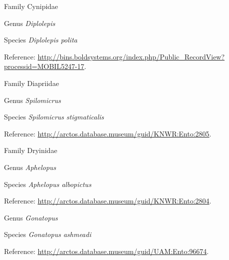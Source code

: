 \documentclass[9pt, article]{memoir}
\begin{document}
\begin{multicols}{2}
\vspace{6pt}\noindent\hspace{24pt}Family Cynipidae


\vspace{6pt}\noindent\hspace{30pt}Genus \textit{Diplolepis}


\vspace{6pt}\noindent\hspace{36pt}Species \textit{Diplolepis polita}


\vspace{6pt}Reference: 
\url{http://bins.boldsystems.org/index.php/Public_RecordView?processid=MOBIL5247-17}.

\vspace{6pt}\noindent\hspace{24pt}Family Diapriidae


\vspace{6pt}\noindent\hspace{30pt}Genus \textit{Spilomicrus}


\vspace{6pt}\noindent\hspace{36pt}Species \textit{Spilomicrus stigmaticalis}


\vspace{6pt}Reference: 
\url{http://arctos.database.museum/guid/KNWR:Ento:2805}.

\vspace{6pt}\noindent\hspace{24pt}Family Dryinidae


\vspace{6pt}\noindent\hspace{30pt}Genus \textit{Aphelopus}


\vspace{6pt}\noindent\hspace{36pt}Species \textit{Aphelopus albopictus}


\vspace{6pt}Reference: 
\url{http://arctos.database.museum/guid/KNWR:Ento:2804}.

\vspace{6pt}\noindent\hspace{30pt}Genus \textit{Gonatopus}


\vspace{6pt}\noindent\hspace{36pt}Species \textit{Gonatopus ashmeadi}


\vspace{6pt}Reference: 
\url{http://arctos.database.museum/guid/UAM:Ento:96674}.


\end{multicols}
\end{document}
